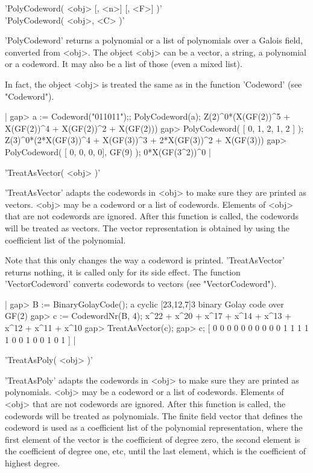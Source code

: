 
'PolyCodeword( <obj> [, <n>] [, <F>] )'\\
'PolyCodeword( <obj>, <C> )'

'PolyCodeword' returns  a  polynomial or a  list   of polynomials over  a
Galois field, converted from <obj>.  The object <obj>  can be a vector, a
string, a polynomial or a codeword. It may also be a  list of those (even
a mixed list).

In fact, the   object  <obj> is treated  the  same  as   in the  function
'Codeword' (see "Codeword").

|    gap> a := Codeword("011011");; PolyCodeword(a);
    Z(2)^0*(X(GF(2))^5 + X(GF(2))^4 + X(GF(2))^2 + X(GF(2)))
    gap> PolyCodeword( [ 0, 1, 2, 1, 2 ] );
    Z(3)^0*(2*X(GF(3))^4 + X(GF(3))^3 + 2*X(GF(3))^2 + X(GF(3)))
    gap> PolyCodeword( [ 0, 0, 0, 0], GF(9) );
    0*X(GF(3^2))^0 |


'TreatAsVector( <obj> )'

'TreatAsVector' adapts the  codewords  in  <obj>  to make sure  they  are
printed as   vectors.    <obj> may   be    a  codeword   or a    list  of
codewords.  Elements of <obj> that are   not codewords are ignored. After
this function  is called, the codewords will  be  treated as vectors. The
vector representation is  obtained by using the  coefficient list of  the
polynomial.

Note that    this only  changes   the   way    a codeword   is   printed.
'TreatAsVector' returns nothing, it  is called only  for its side effect.
The   function  'VectorCodeword' converts    codewords to  vectors   (see
"VectorCodeword").

|    gap> B := BinaryGolayCode();
    a cyclic [23,12,7]3 binary Golay code over GF(2)
    gap> c := CodewordNr(B, 4);
    x^22 + x^20 + x^17 + x^14 + x^13 + x^12 + x^11 + x^10
    gap> TreatAsVector(c);
    gap> c;
    [ 0 0 0 0 0 0 0 0 0 0 1 1 1 1 1 0 0 1 0 0 1 0 1 ] |


'TreatAsPoly( <obj> )'

'TreatAsPoly' adapts the codewords in <obj> to make sure they are printed
as polynomials. <obj> may be a codeword or a  list of codewords. Elements
of <obj> that  are  not codewords are  ignored.  After  this  function is
called, the codewords will  be treated as  polynomials. The finite  field
vector that defines  the codeword is  used as a  coefficient list of  the
polynomial representation,  where the first element  of the vector is the
coefficient  of degree zero,   the second element   is the coefficient of
degree one,  etc,  until the last element,   which is the  coefficient of
highest degree.

